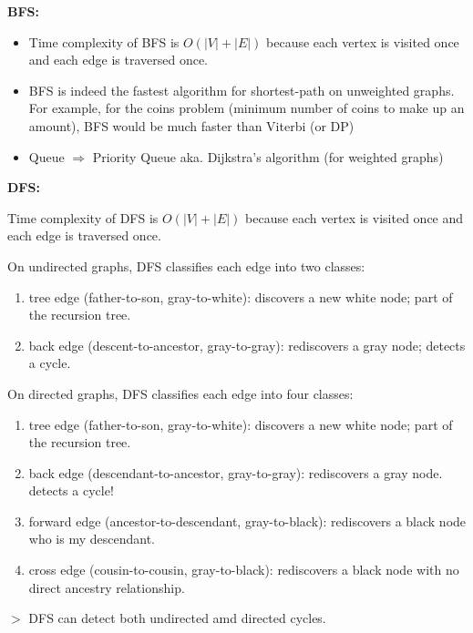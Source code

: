 \documentclass[12pt,a4paper]{article}
\newcommand{\remark}[1]{
    {\small $>$ {\color{blue} #1}}
}
\begin{document}
\textbf{BFS:}

\begin{itemize}
    \item Time complexity of BFS is \(O(|V| + |E|)\) because each vertex is visited once and each edge is traversed once.
    \item BFS is indeed the fastest algorithm for shortest-path on unweighted graphs. For example, for the coins problem (minimum number of coins to make up an amount), BFS would be much faster than Viterbi (or DP)
    \item Queue $\Rightarrow$ Priority Queue aka. Dijkstra's algorithm (for weighted graphs)
\end{itemize}

\textbf{DFS:}

Time complexity of DFS is \(O(|V| + |E|)\) because each vertex is visited once and each edge is traversed once.

On undirected graphs, DFS classifies each edge into two classes:

\begin{enumerate}
    \item tree edge (father-to-son, gray-to-white): discovers a new white node; part of the recursion tree.
    \item back edge (descent-to-ancestor, gray-to-gray): rediscovers a gray node; detects a cycle.
\end{enumerate}

On directed graphs, DFS classifies each edge into four classes:

\begin{enumerate}
    \item tree edge (father-to-son, gray-to-white): discovers a new white node; part of the recursion tree.
    \item back edge (descendant-to-ancestor, gray-to-gray): rediscovers a gray node. detects a cycle!
    \item forward edge (ancestor-to-descendant, gray-to-black): rediscovers a black node who is my descendant.
    \item cross edge (cousin-to-cousin, gray-to-black): rediscovers a black node with no direct ancestry relationship.
\end{enumerate}

\remark{DFS can detect both undirected amd directed cycles.}
\end{document}
